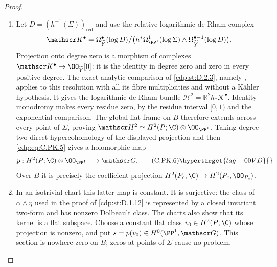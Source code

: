 \begin{proof}
\begin{enumerate}[label={$\langle1\rangle$\arabic*.},leftmargin=*]
\item Let $D=(h^{-1}(\Sigma))_{\mathrm{red}}$ and use the
relative logarithmic de Rham complex
\[
 \mathscr K^\bullet=
 \Omega_{\widetilde Y}^\bullet(\log D)\big/
 \bigl(h^*\Omega_{\PP^1}^1(\log\Sigma)
       \wedge\Omega_{\widetilde Y}^{\bullet-1}(\log D)\bigr).
\]
Projection onto degree zero is a morphism of complexes
$\mathscr K^\bullet\to\OO_{\widetilde Y}[0]$:
it is the identity in degree zero and zero in every
positive degree. The exact analytic comparison of \ref{cdp:st:D.2.3},
namely \cite[Theorem~2.18 and \S\S2.19--2.21]{Steenbrink1976},
applies to this resolution with all its fibre multiplicities
and without a K\"ahler hypothesis. It gives the logarithmic
de Rham bundle
$\mathscr H^2=\mathbb R^2h_*\mathscr K^\bullet$.
Identity monodromy makes every residue zero, by the
residue interval $[0,1)$ and the exponential comparison.
The global flat frame on $B$ therefore extends across
every point of $\Sigma$, proving
$\mathscr H^2\simeq H^2(P;\C)\otimes\OO_{\PP^1}$.
Taking degree-two direct hypercohomology of the displayed
projection and then \eqref{cdp:eq:C.PK.5} gives a holomorphic map
\[
 p:H^2(P;\C)\otimes\OO_{\PP^1}
          \longrightarrow\mathscr G.
\tag{C.PK.6}\hypertarget{tag-00VD}{}\label{cdp:eq:C.PK.6}
\]
Over $B$ it is precisely the coefficient projection
$H^2(P_c;\C)\to H^2(P_c,\OO_{P_c})$.

\item In an isotrivial chart this latter map is constant. It is
surjective: the class of
$\overline\alpha\wedge\overline\eta$ used in the proof
of \ref{cdp:st:D.1.12} is represented by a closed invariant two-form
and has nonzero Dolbeault class. The charts also show
that its kernel is a flat subspace. Choose a constant flat
class $v_0\in H^2(P;\C)$ whose projection is nonzero,
and put $s=p(v_0)\in H^0(\PP^1,\mathscr G)$.
This section is nowhere zero on $B$; zeros at points
of $\Sigma$ cause no problem.


\end{enumerate}
\end{proof}
